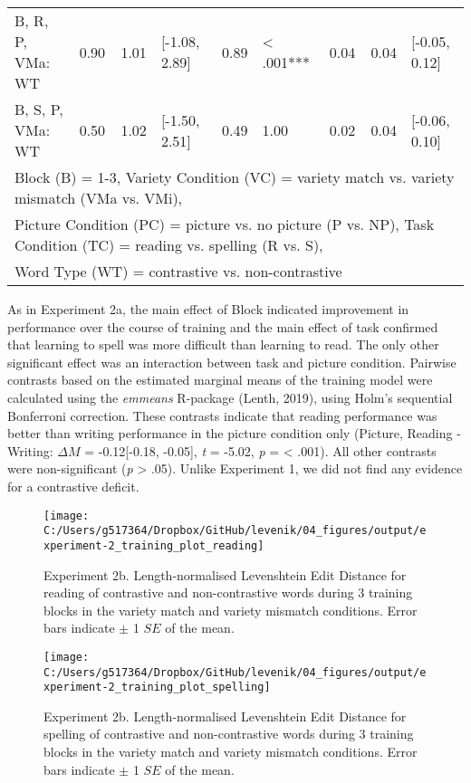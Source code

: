\documentclass[doc,floatsintext]{apa6}
\begin{document}
\begin{table}[!h]
{\begin{tabular}{lrrlrlrrl}
B, R, P, VMa: WT & 0.90 & 1.01 & [-1.08, 2.89] & 0.89 & < .001*** & 0.04 & 0.04 & [-0.05, 0.12]\\
B, S, P, VMa: WT & 0.50 & 1.02 & [-1.50, 2.51] & 0.49 & 1.00 & 0.02 & 0.04 & [-0.06, 0.10]\\
\bottomrule
\multicolumn{9}{l}{Block (B) = 1-3, Variety Condition (VC) = variety match vs. variety mismatch (VMa vs. VMi),}\\
\multicolumn{9}{l}{Picture Condition (PC) = picture vs. no picture (P vs. NP), Task Condition (TC) = reading vs. spelling (R vs. S),}\\
\multicolumn{9}{l}{Word Type (WT) = contrastive vs. non-contrastive}\\
\end{tabular}}
\end{table}

As in Experiment 2a, the main effect of Block indicated improvement in
performance over the course of training and the main effect of task
confirmed that learning to spell was more difficult than learning to
read. The only other significant effect was an interaction between task
and picture condition. Pairwise contrasts based on the estimated
marginal means of the training model were calculated using the
\emph{emmeans} R-package (Lenth, 2019), using Holm's sequential
Bonferroni correction. These contrasts indicate that reading performance
was better than writing performance in the picture condition only
(Picture, Reading - Writing: \(\Delta{M}\) = -0.12{[}-0.18, -0.05{]},
\emph{t} = -5.02, \emph{p} = \textless{} .001). All other contrasts were
non-significant (\emph{p} \textgreater{} .05). Unlike Experiment 1, we
did not find any evidence for a contrastive deficit.

\begin{figure}[htb]

{\centering \texttt{[image: C:/Users/g517364/Dropbox/GitHub/levenik/04\_figures/output/experiment-2\_training\_plot\_reading]} 

}

\caption{Experiment 2b. Length-normalised Levenshtein Edit Distance for reading of contrastive and non-contrastive words during 3 training blocks in the variety match and variety mismatch conditions. Error bars indicate $\pm$ 1 $SE$ of the mean.}\label{fig:ex2-train-reading-plots}
\end{figure}

\begin{figure}[htb]

{\centering \texttt{[image: C:/Users/g517364/Dropbox/GitHub/levenik/04\_figures/output/experiment-2\_training\_plot\_spelling]} 

}

\caption{Experiment 2b. Length-normalised Levenshtein Edit Distance for spelling of contrastive and non-contrastive words during 3 training blocks in the variety match and variety mismatch conditions. Error bars indicate $\pm$ 1 $SE$ of the mean.}\label{fig:ex2-train-spelling-plots}
\end{figure}
\end{document}
